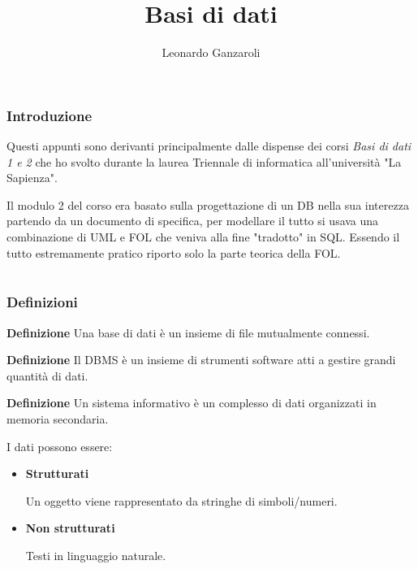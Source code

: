\documentclass{article}
\title{Basi di dati}
\author{Leonardo Ganzaroli}
\date{}
\begin{document}
\maketitle


\tableofcontents

\newpage

\hypersetup{allcolors=black}

\section*{Introduzione}

Questi appunti sono derivanti principalmente dalle dispense dei corsi \textit{Basi di dati 1 e 2} che ho svolto durante la laurea Triennale di informatica all'università "La Sapienza".\newline

\noindent Il modulo 2 del corso era basato sulla progettazione di un DB nella sua interezza partendo da un documento di specifica, per modellare il tutto si usava una combinazione di UML e FOL che veniva alla fine "tradotto" in SQL. Essendo il tutto estremamente pratico riporto solo la parte teorica della FOL.

\newpage

\part{}

\section{Definizioni}

\textbf{Definizione} Una base di dati è un insieme di file mutualmente connessi.\newline

\noindent\textbf{Definizione} Il DBMS è un insieme di strumenti software atti a gestire grandi quantità di dati.\newline

\noindent\textbf{Definizione} Un sistema informativo è un complesso di dati organizzati in memoria secondaria.\newline

\noindent I dati possono essere:
\begin{itemize}
    \item \textbf{Strutturati}

        Un oggetto viene rappresentato da stringhe di simboli/numeri.

    \item \textbf{Non strutturati}

        Testi in linguaggio naturale.\newline
    
    
\end{itemize}
\end{document}
